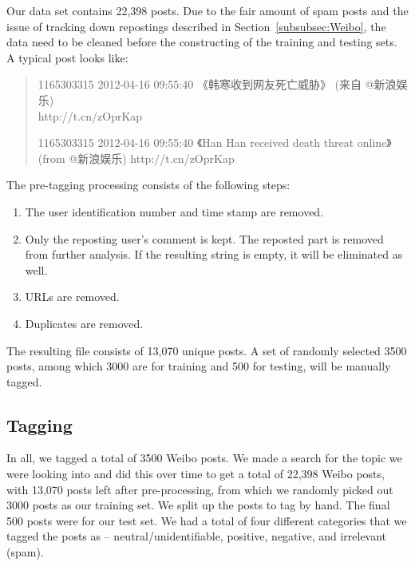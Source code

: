 \documentclass[11pt]{article}
\newcommand{\1}[1]{{\mathbf 1}\left\{#1\right\}}        %
\begin{document}
Our data set contains 22,398 posts. 
Due to the fair amount of spam posts and the issue of tracking down repostings described in Section~\ref{subsubsec:Weibo}, the data need to be cleaned before the constructing of the training and testing sets.
A typical post looks like:
\begin{quote}
1165303315 2012-04-16 09:55:40  《韩寒收到网友死亡威胁》 (来自 @新浪娱乐) \\ 
http://t.cn/zOprKap

1165303315 2012-04-16 09:55:40  《Han Han received death threat online》 (from @新浪娱乐) http://t.cn/zOprKap
\end{quote} 
The pre-tagging processing consists of the following steps:
\begin{enumerate}
\item The user identification number and time stamp are removed.
\item Only the reposting user's comment is kept. The reposted part is removed from further analysis. If the resulting string is empty, it will be eliminated as well.
\item URLs are removed.
\item Duplicates are removed.
\end{enumerate}

The resulting file consists of 13,070 unique posts. A set of randomly selected 3500 posts, among which 3000 are for training and 500 for testing, will be manually tagged.



\subsection{Tagging}


In all, we tagged a total of 3500 Weibo posts.  We made a search for the topic we were looking into and did this over time to get a total of 22,398 Weibo posts, with 13,070 posts left after pre-processing, from which we randomly picked out 3000 posts as our training set.  We split up the posts to tag by hand.  The final 500 posts were for our test set. We had a total of four different categories that we tagged the posts as -- neutral/unidentifiable, positive, negative, and irrelevant (spam).  
\end{document}
